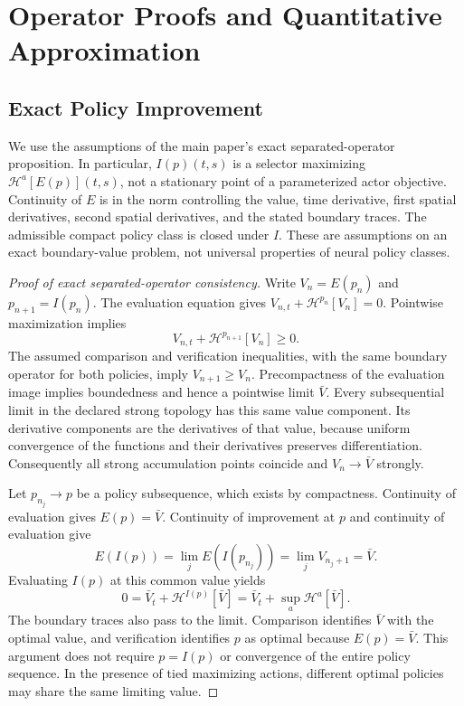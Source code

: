 \section{Operator Proofs and Quantitative Approximation}
\subsection{Exact Policy Improvement}
We use the assumptions of the main paper's exact separated-operator proposition. In particular, $I(p)(t,s)$ is a selector maximizing $\mathcal H^a[E(p)](t,s)$, not a stationary point of a parameterized actor objective. Continuity of $E$ is in the norm controlling the value, time derivative, first spatial derivatives, second spatial derivatives, and the stated boundary traces. The admissible compact policy class is closed under $I$. These are assumptions on an exact boundary-value problem, not universal properties of neural policy classes.

\begin{proof}[Proof of exact separated-operator consistency]
Write $V_n=E(p_n)$ and $p_{n+1}=I(p_n)$. The evaluation equation gives $V_{n,t}+\mathcal H^{p_n}[V_n]=0$. Pointwise maximization implies
\[
 V_{n,t}+\mathcal H^{p_{n+1}}[V_n]\geq0.
\]
The assumed comparison and verification inequalities, with the same boundary operator for both policies, imply $V_{n+1}\geq V_n$. Precompactness of the evaluation image implies boundedness and hence a pointwise limit $\bar V$. Every subsequential limit in the declared strong topology has this same value component. Its derivative components are the derivatives of that value, because uniform convergence of the functions and their derivatives preserves differentiation. Consequently all strong accumulation points coincide and $V_n\to\bar V$ strongly.

Let $p_{n_j}\to p$ be a policy subsequence, which exists by compactness. Continuity of evaluation gives $E(p)=\bar V$. Continuity of improvement at $p$ and continuity of evaluation give
\[
 E(I(p))=\lim_j E(I(p_{n_j}))
       =\lim_j V_{n_j+1}=\bar V.
\]
Evaluating $I(p)$ at this common value yields
\[
 0=\bar V_t+\mathcal H^{I(p)}[\bar V]
  =\bar V_t+\sup_a\mathcal H^a[\bar V].
\]
The boundary traces also pass to the limit. Comparison identifies $\bar V$ with the optimal value, and verification identifies $p$ as optimal because $E(p)=\bar V$. This argument does not require $p=I(p)$ or convergence of the entire policy sequence. In the presence of tied maximizing actions, different optimal policies may share the same limiting value.
\end{proof}

